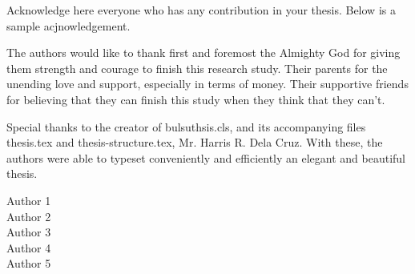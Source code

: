 \begin{acknowledgment}
Acknowledge here everyone who has any contribution in your thesis. Below is a sample acjnowledgement.

The authors would like to thank first and foremost the Almighty God for giving them strength and courage to finish this research study. Their parents for the unending love and support, especially in terms of money. Their supportive friends for believing that they can finish this study when they think that they can't.



Special thanks to the creator of bulsuthsis.cls, and its accompanying files thesis.tex and thesis-structure.tex, Mr. Harris R. Dela Cruz. With these, the authors were able to typeset conveniently and efficiently an elegant and beautiful thesis.

\begin{flushright}
Author 1\\
Author 2\\
Author 3\\
Author 4\\
Author 5
\end{flushright}

\end{acknowledgment}
